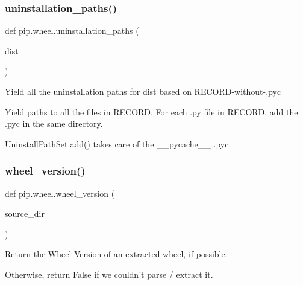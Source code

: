\subsubsection{\texorpdfstring{uninstallation\+\_\+paths()}{uninstallation\_paths()}}
{\footnotesize\ttfamily def pip.\+wheel.\+uninstallation\+\_\+paths (\begin{DoxyParamCaption}\item[{}]{dist }\end{DoxyParamCaption})}

\begin{DoxyVerb}Yield all the uninstallation paths for dist based on RECORD-without-.pyc

Yield paths to all the files in RECORD. For each .py file in RECORD, add
the .pyc in the same directory.

UninstallPathSet.add() takes care of the __pycache__ .pyc.
\end{DoxyVerb}
 \mbox{\label{namespacepip_1_1wheel_a73536b9b31527a08e3b7933fb6ccc7c3}} 
\subsubsection{\texorpdfstring{wheel\+\_\+version()}{wheel\_version()}}
{\footnotesize\ttfamily def pip.\+wheel.\+wheel\+\_\+version (\begin{DoxyParamCaption}\item[{}]{source\+\_\+dir }\end{DoxyParamCaption})}

\begin{DoxyVerb}Return the Wheel-Version of an extracted wheel, if possible.

Otherwise, return False if we couldn't parse / extract it.
\end{DoxyVerb}
 